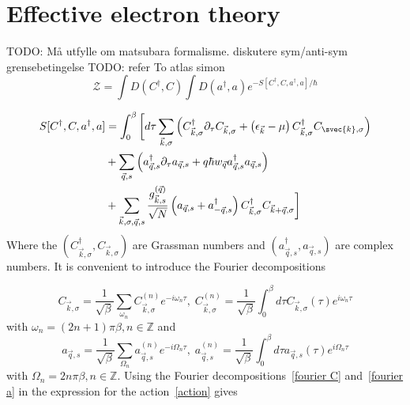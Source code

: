 \documentclass{article}
\begin{document}
\section{Effective electron theory}
TODO: Må utfylle om matsubara formalisme. diskutere sym/anti-sym grensebetingelse
TODO: refer To atlas simon
\begin{equation}
    \mathcal{Z} = \int D(C^{\dagger}, C) \int D(a^{\dagger}, a) e^{-S[C^{\dagger},C,a^{\dagger},a] / \hbar}
    \label{path integral}
\end{equation}

\begin{align}
    S[C^{\dagger},C,a^{\dagger},a] &= \int_0^{\beta}\bigg[d\tau \sum_{\vec{k},\sigma}\left( C_{\vec{k},\sigma}^{\dagger} \partial_{\tau} C_{\vec{k},\sigma} + \left(\epsilon_{\vec{k}} - \mu\right) C_{\vec{k},\sigma}^{\dagger} C_{\svec{k},\sigma}\right) \nonumber\\ 
                                  &+ \sum_{\vec{q},s}\left( a_{\vec{q},s}^{\dagger} \partial_{\tau} a_{\vec{q},s} +q \hbar w_{\vec{q}} a_{\vec{q},s}^{\dagger}a_{\vec{q},s}\right) \label{action} \\
                                  &+ \sum_{\vec{k},\sigma,\vec{q},s} \frac{g_{\vec{k},s}^{(\vec{q})}}{\sqrt{N}} \left(a_{\vec{q},s} + a_{-\vec{q}, s}^{\dagger}\right) C_{\vec{k},\sigma}^{\dagger} C_{\vec{k} + \vec{q},\sigma}\bigg]\nonumber
\end{align}
Where the $(C_{\vec{k},\sigma}^{\dagger}, C_{\vec{k},\sigma})$ are Grassman numbers and $(a_{\vec{q},s}^{\dagger},a_{\vec{q},s})$ are complex numbers. It is convenient to introduce the Fourier decompositions

\begin{equation}
C_{\vec{k},\sigma} = \frac{1}{\sqrt{\beta}}\sum_{\omega_n} C^{(n)}_{\vec{k},\sigma} e^{-i \omega_n \tau},\; C^{(n)}_{\vec{k},\sigma} = \frac{1}{\sqrt{\beta}} \int_0^{\beta} d\tau C_{\vec{k},\sigma}(\tau) e^{i \omega_n \tau}
\label{fourier C}
\end{equation}
with $\omega_n = (2n + 1)\pi\beta, n \in  \mathbb{Z}$ and
\begin{equation}
a_{\vec{q},s} = \frac{1}{\sqrt{\beta}}\sum_{\Omega_n} a^{(n)}_{\vec{q},s} e^{-i \Omega_n \tau},\; a^{(n)}_{\vec{q},s} = \frac{1}{\sqrt{\beta}} \int_0^{\beta} d\tau a_{\vec{q},s}(\tau) e^{i \Omega_n \tau}
\label{fourier a}
\end{equation}
with  $\Omega_n = 2n\pi\beta, n \in  \mathbb{Z}$. Using the Fourier decompositions~\cref{fourier C} and~\cref{fourier a} in the expression for the action~\cref{action} gives
\end{document}
